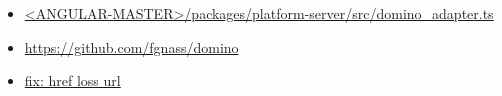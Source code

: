 \begin{itemize}
  \item \href{https://github.com/angular/angular/blob/master/packages/platform-server/src/domino_adapter.ts}
        {<ANGULAR-MASTER>/packages/platform-server/src/domino\_adapter.ts}
\end{itemize}


\begin{itemize}
  \item \url{https://github.com/fgnass/domino}
\end{itemize}




\begin{itemize}
  \item \href{fix: href loss url}
        {fix: href loss url}
\end{itemize}





